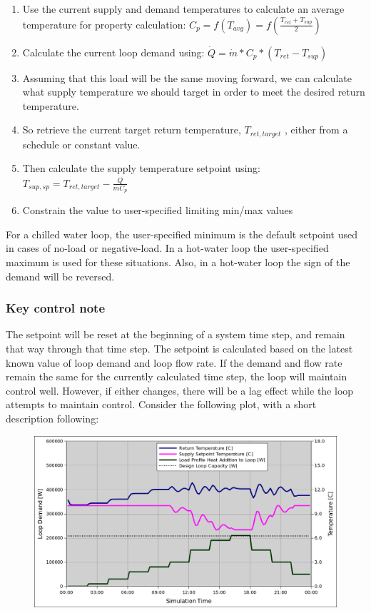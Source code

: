 \begin{enumerate}
\def\labelenumi{\arabic{enumi}.}
\item
  Use the current supply and demand temperatures to calculate an average temperature for property calculation: \(C_p = f\left(T_{avg}\right) = f\left(\frac{T_{ret}+T_{sup}}{2}\right)\)
\item
  Calculate the current loop demand using: \(\dot{Q} = \dot{m} * C_p * \left(T_{ret} - T_{sup}\right)\)
\item
  Assuming that this load will be the same moving forward, we can calculate what supply temperature we should target in order to meet the desired return temperature.
\item
  So retrieve the current target return temperature, \(T_{ret,target}\) , either from a schedule or constant value.
\item
  Then calculate the supply temperature setpoint using: \(T_{sup,sp} = T_{ret,target} - \frac{\dot{Q}}{\dot{m} C_p}\)
\item
  Constrain the value to user-specified limiting min/max values
\end{enumerate}

For a chilled water loop, the user-specified minimum is the default setpoint used in cases of no-load or negative-load. In a hot-water loop the user-specified maximum is used for these situations. Also, in a hot-water loop the sign of the demand will be reversed.

\subsubsection{Key control note}\label{key-control-note}

The setpoint will be reset at the beginning of a system time step, and remain that way through that time step. The setpoint is calculated based on the latest known value of loop demand and loop flow rate. If the demand and flow rate remain the same for the currently calculated time step, the loop will maintain control well. However, if either changes, there will be a lag effect while the loop attempts to maintain control. Consider the following plot, with a short description following:

\begin{figure}[htbp]
\centering
\includegraphics{media/SetPointManager-ResetForReturnControl1.png}
\caption{}
\end{figure}

